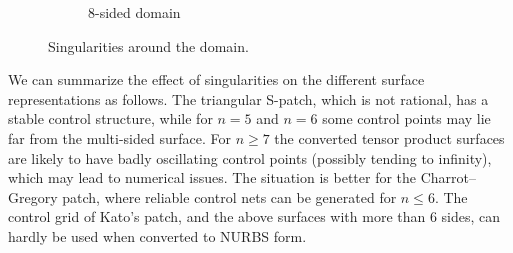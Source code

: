 \documentclass[9pt,academicons]{article}
\begin{document}
\begin{figure}
\begin{subfigure}{.45\textwidth}
    \caption{8-sided domain}
    \label{fig:singularities8}
  \end{subfigure}
  \caption{Singularities around the domain.}
  \label{fig:singularities}
\end{figure}

We can summarize the effect of singularities on the different surface representations
as follows.
The triangular S-patch, which is not rational, has a
stable control structure, while for $n=5$ and $n=6$ some control points may
lie far from the multi-sided surface. For $n\geq 7$ the converted tensor product
surfaces are likely to have badly oscillating control points (possibly tending to infinity),
which may lead to numerical issues. The situation is better for the
Charrot--Gregory patch, where reliable control nets can be generated for $n\leq 6$.
The control grid of Kato's patch, and the above surfaces with more than 6 sides,
can hardly be used when converted to NURBS form.
\end{document}
